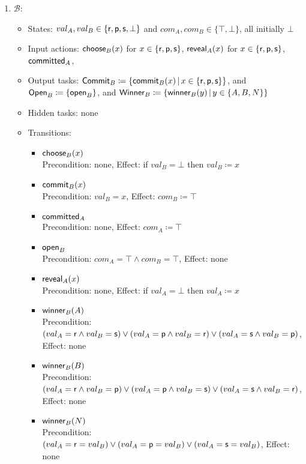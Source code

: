 \documentclass[10pt]{article}
\begin{document}
\begin{example}[$\RPSReal$]
\begin{enumerate}
\item $\mathcal{B}$:
\begin{itemize}
\item States: $val_A, val_B \in \{\mathsf{r},\mathsf{p},\mathsf{s},\bot\}$ and $com_A, com_B \in \{\top,\bot\}$, all initially $\bot$
\item Input actions: $\mathsf{choose}_B(x)$ for $x \in \{\mathsf{r},\mathsf{p},\mathsf{s}\}$, $\mathsf{reveal}_A(x)$ for $x \in \{\mathsf{r},\mathsf{p},\mathsf{s}\}$, $\mathsf{committed}_A$, 
\item Output tasks: $\mathsf{Commit}_B \coloneqq \{\mathsf{commit}_B(x) \, | \, x \in \{\mathsf{r},\mathsf{p},\mathsf{s}\}\}$, and $\mathsf{Open}_B \coloneqq \{\mathsf{open}_B\}$, and $\mathsf{Winner}_B \coloneqq \{\mathsf{winner}_B(y) \, | \, y \in \{A,B,N\}\}$ 
\item Hidden tasks: none
\item Transitions:
\begin{itemize}
\item $\mathsf{choose}_B(x)$ \\
Precondition: none, Effect: if $val_B = \bot$ then $val_B \coloneqq x$
\item $\mathsf{commit}_B(x)$ \\
Precondition: $val_B = x$, Effect: $com_B \coloneqq \top$
\item $\mathsf{committed}_A$ \\
Precondition: none, Effect: $com_A \coloneqq \top$
\item $\mathsf{open}_B$\\
Precondition: $com_A = \top \wedge com_B = \top$, Effect: none
\item $\mathsf{reveal}_A(x)$\\
Precondition: none, Effect: if $val_A = \bot$ then $val_A \coloneqq x$
\item $\mathsf{winner}_B(A)$ \\
Precondition: $(val_A = \mathsf{r} \wedge val_B = \mathsf{s}) \vee (val_A = \mathsf{p} \wedge val_B = \mathsf{r}) \vee (val_A = \mathsf{s} \wedge val_B = \mathsf{p})$, Effect: none
\item $\mathsf{winner}_B(B)$ \\
Precondition: $(val_A = \mathsf{r} \wedge val_B = \mathsf{p}) \vee (val_A = \mathsf{p} \wedge val_B = \mathsf{s}) \vee (val_A = \mathsf{s} \wedge val_B = \mathsf{r})$, Effect: none
\item $\mathsf{winner}_B(N)$ \\
Precondition: $(val_A = \mathsf{r} = val_B) \vee (val_A = \mathsf{p} = val_B) \vee (val_A = \mathsf{s} = val_B)$, Effect: none
\end{itemize}
\end{itemize}


\end{enumerate}
\end{example}
\end{document}
